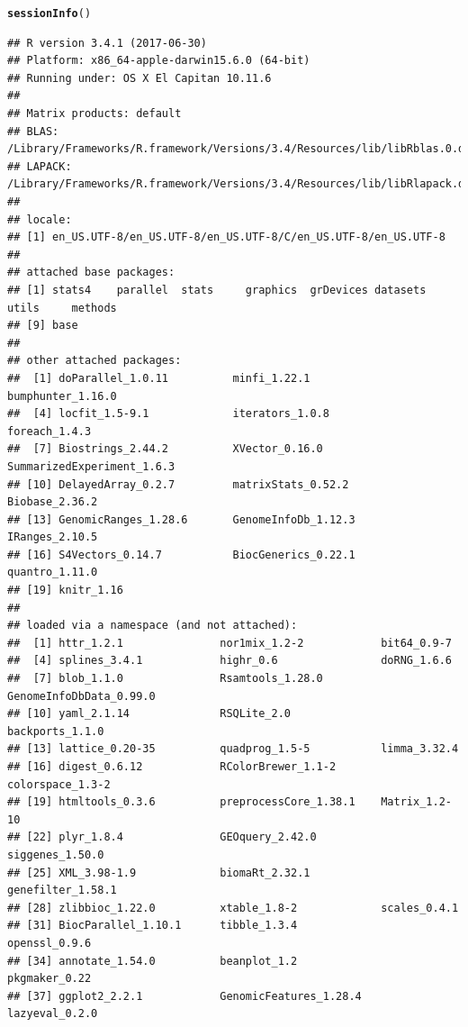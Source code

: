 \documentclass{article}\usepackage[]{graphicx}\usepackage[usenames,dvipsnames]{color}
\makeatletter
\newcommand{\hlstd}[1]{\textcolor[rgb]{0.345,0.345,0.345}{#1}}%
\newcommand{\hlkwd}[1]{\textcolor[rgb]{0.737,0.353,0.396}{\textbf{#1}}}%
\newenvironment{kframe}{%
 \def\at@end@of@kframe{}%
 \ifinner\ifhmode%
  \def\at@end@of@kframe{\end{minipage}}%
  \begin{minipage}{\columnwidth}%
 \fi\fi%
 \def\FrameCommand##1{\hskip\@totalleftmargin \hskip-\fboxsep
 \colorbox{shadecolor}{##1}\hskip-\fboxsep
     \hskip-\linewidth \hskip-\@totalleftmargin \hskip\columnwidth}%
 \MakeFramed {\advance\hsize-\width
   \@totalleftmargin\z@ \linewidth\hsize
   \@setminipage}}%
 {\par\unskip\endMakeFramed%
 \at@end@of@kframe}
\newenvironment{knitrout}{}{} %
\makeatother
\begin{document}
\begin{knitrout}
\color{fgcolor}\begin{kframe}
\begin{alltt}
\hlkwd{sessionInfo}\hlstd{()}
\end{alltt}
\begin{verbatim}
## R version 3.4.1 (2017-06-30)
## Platform: x86_64-apple-darwin15.6.0 (64-bit)
## Running under: OS X El Capitan 10.11.6
## 
## Matrix products: default
## BLAS: /Library/Frameworks/R.framework/Versions/3.4/Resources/lib/libRblas.0.dylib
## LAPACK: /Library/Frameworks/R.framework/Versions/3.4/Resources/lib/libRlapack.dylib
## 
## locale:
## [1] en_US.UTF-8/en_US.UTF-8/en_US.UTF-8/C/en_US.UTF-8/en_US.UTF-8
## 
## attached base packages:
## [1] stats4    parallel  stats     graphics  grDevices datasets  utils     methods  
## [9] base     
## 
## other attached packages:
##  [1] doParallel_1.0.11          minfi_1.22.1               bumphunter_1.16.0         
##  [4] locfit_1.5-9.1             iterators_1.0.8            foreach_1.4.3             
##  [7] Biostrings_2.44.2          XVector_0.16.0             SummarizedExperiment_1.6.3
## [10] DelayedArray_0.2.7         matrixStats_0.52.2         Biobase_2.36.2            
## [13] GenomicRanges_1.28.6       GenomeInfoDb_1.12.3        IRanges_2.10.5            
## [16] S4Vectors_0.14.7           BiocGenerics_0.22.1        quantro_1.11.0            
## [19] knitr_1.16                
## 
## loaded via a namespace (and not attached):
##  [1] httr_1.2.1               nor1mix_1.2-2            bit64_0.9-7             
##  [4] splines_3.4.1            highr_0.6                doRNG_1.6.6             
##  [7] blob_1.1.0               Rsamtools_1.28.0         GenomeInfoDbData_0.99.0 
## [10] yaml_2.1.14              RSQLite_2.0              backports_1.1.0         
## [13] lattice_0.20-35          quadprog_1.5-5           limma_3.32.4            
## [16] digest_0.6.12            RColorBrewer_1.1-2       colorspace_1.3-2        
## [19] htmltools_0.3.6          preprocessCore_1.38.1    Matrix_1.2-10           
## [22] plyr_1.8.4               GEOquery_2.42.0          siggenes_1.50.0         
## [25] XML_3.98-1.9             biomaRt_2.32.1           genefilter_1.58.1       
## [28] zlibbioc_1.22.0          xtable_1.8-2             scales_0.4.1            
## [31] BiocParallel_1.10.1      tibble_1.3.4             openssl_0.9.6           
## [34] annotate_1.54.0          beanplot_1.2             pkgmaker_0.22           
## [37] ggplot2_2.2.1            GenomicFeatures_1.28.4   lazyeval_0.2.0          

\end{verbatim}
\end{kframe}
\end{knitrout}
\end{document}
